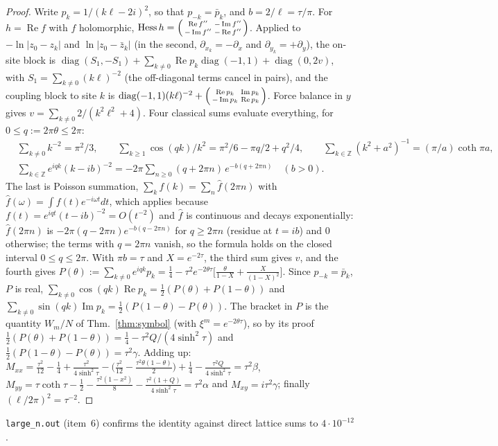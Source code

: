 \documentclass[11pt]{article}
\theoremstyle{remark}
\begin{document}
\begin{proof}
Write $p_k=1/(k\ell-2i)^2$, so that $p_{-k}=\bar p_k$, and $b=2/\ell=\tau/\pi$. For $h=\operatorname{Re}f$ with $f$ holomorphic,
$\operatorname{Hess}h=\begin{psmallmatrix}\operatorname{Re}f''&-\operatorname{Im}f''\\-\operatorname{Im}f''&-\operatorname{Re}f''\end{psmallmatrix}$.
Applied to $-\ln|z_0-z_k|$ and $\ln|z_0-\bar z_k|$ (in the second, $\partial_{x_k}=-\partial_x$ and $\partial_{y_k}=+\partial_y$), the
on-site block is $\operatorname{diag}(S_1,-S_1)+\sum_{k\ne0}\operatorname{Re}p_k\operatorname{diag}(-1,1)+\operatorname{diag}(0,2v)$, with
$S_1=\sum_{k\ne0}(k\ell)^{-2}$ (the off-diagonal terms cancel in pairs), and the coupling block to site $k$ is
$\operatorname{diag}(-1,1)(k\ell)^{-2}+\begin{psmallmatrix}\operatorname{Re}p_k&\operatorname{Im}p_k\\-\operatorname{Im}p_k&\operatorname{Re}p_k\end{psmallmatrix}$.
Force balance in $y$ gives $v=\sum_{k\ne0}2/(k^2\ell^2+4)$. Four classical sums evaluate everything, for $0\le q:=2\pi\theta\le2\pi$:
\begin{align*}
&\textstyle\sum_{k\ne0}k^{-2}=\pi^2/3,\qquad \sum_{k\ge1}\cos(qk)/k^2=\pi^2/6-\pi q/2+q^2/4,\qquad
\sum_{k\in\mathbb Z}(k^2+a^2)^{-1}=(\pi/a)\coth\pi a,\\
&\textstyle\sum_{k\in\mathbb Z}e^{iqk}(k-ib)^{-2}=-2\pi\sum_{n\ge0}(q+2\pi n)\,e^{-b(q+2\pi n)}\quad(b>0).
\end{align*}
The last is Poisson summation, $\sum_kf(k)=\sum_n\hat f(2\pi n)$ with $\hat f(\omega)=\int f(t)e^{-i\omega t}dt$, which applies
because $f(t)=e^{iqt}(t-ib)^{-2}=O(t^{-2})$ and $\hat f$ is continuous and decays exponentially: $\hat f(2\pi n)$ is
$-2\pi(q-2\pi n)e^{-b(q-2\pi n)}$ for $q\ge2\pi n$ (residue at $t=ib$) and $0$ otherwise; the terms with $q=2\pi n$ vanish, so
the formula holds on the closed interval $0\le q\le2\pi$. With $\pi b=\tau$ and
$X=e^{-2\tau}$, the third sum gives $v$, and the fourth gives
$P(\theta):=\sum_{k\ne0}e^{iqk}p_k=\frac14-\tau^2e^{-2\theta\tau}\big[\frac\theta{1-X}+\frac X{(1-X)^2}\big]$. Since
$p_{-k}=\bar p_k$, $P$ is real, $\sum_{k\ne0}\cos(qk)\operatorname{Re}p_k=\frac12(P(\theta)+P(1-\theta))$ and
$\sum_{k\ne0}\sin(qk)\operatorname{Im}p_k=\frac12(P(1-\theta)-P(\theta))$. The bracket in $P$ is the quantity $W_m/N$ of
Thm.~\ref{thm:symbol} (with $\xi^m=e^{-2\theta\tau}$), so by its proof $\frac12(P(\theta)+P(1-\theta))=\frac14-\tau^2Q/(4\sinh^2\tau)$ and
$\frac12(P(1-\theta)-P(\theta))=\tau^2\gamma$. Adding up:
$M_{xx}=\frac{\tau^2}{12}-\frac14+\frac{\tau^2}{4\sinh^2\tau}-\big(\frac{\tau^2}{12}-\frac{\tau^2\theta(1-\theta)}2\big)+\frac14-\frac{\tau^2Q}{4\sinh^2\tau}=\tau^2\beta$,
$M_{yy}=\tau\coth\tau-\frac12-\frac{\tau^2(1-x^2)}8-\frac{\tau^2(1+Q)}{4\sinh^2\tau}=\tau^2\alpha$ and $M_{xy}=i\tau^2\gamma$; finally
$(\ell/2\pi)^2=\tau^{-2}$.
\end{proof}
\texttt{large\_n.out} (item~6) confirms the identity against direct lattice sums to $4\cdot10^{-12}$.
\end{document}
